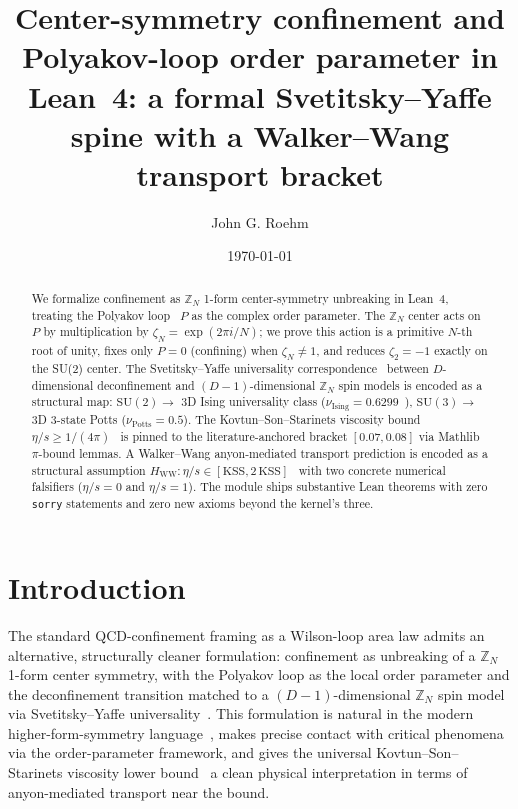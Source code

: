 \documentclass[twocolumn]{revtex4-2}
\newcommand{\Polyakov}{P}
\newcommand{\KSS}{\eta/s}
\newcommand{\nuIsing}{\nu_{\mathrm{Ising}}}
\newcommand{\nuPotts}{\nu_{\mathrm{Potts}}}
\begin{document}
\title{Center-symmetry confinement and Polyakov-loop order parameter
in Lean~4: a formal Svetitsky--Yaffe spine with a Walker--Wang
transport bracket}

\author{John G. Roehm}

\date{\today}

\begin{abstract}
We formalize confinement as $\mathbb{Z}_N$ 1-form center-symmetry
unbreaking in Lean~4, treating the Polyakov loop~\cite{Polyakov1978}
$\Polyakov$ as the
complex order parameter. The $\mathbb{Z}_N$ center acts on $\Polyakov$
by multiplication by $\zeta_N = \exp(2\pi i / N)$; we prove this action
is a primitive $N$-th root of unity, fixes only $\Polyakov = 0$
(confining) when $\zeta_N \neq 1$, and reduces $\zeta_2 = -1$ exactly
on the SU(2) center. The Svetitsky--Yaffe universality
correspondence~\cite{SvetitskyYaffe1982} between $D$-dimensional
deconfinement and $(D{-}1)$-dimensional $\mathbb{Z}_N$ spin models is
encoded as a structural map: $\mathrm{SU}(2) \to$ 3D Ising universality
class ($\nuIsing = 0.6299$~\cite{PelissettoVicari2002,
KosPolandSimmonsDuffin2016}), $\mathrm{SU}(3) \to$ 3D 3-state Potts
($\nuPotts = 0.5$). The Kovtun--Son--Starinets viscosity bound
$\KSS \ge 1/(4\pi)$~\cite{KovtunSonStarinets2005} is pinned to the
literature-anchored bracket $[0.07, 0.08]$ via Mathlib $\pi$-bound
lemmas. A Walker--Wang anyon-mediated transport prediction is encoded
as a structural assumption $H_{\mathrm{WW}} : \KSS \in [\mathrm{KSS},
2\,\mathrm{KSS}]$~\cite{HofmanIqbal2018} with two concrete numerical
falsifiers ($\KSS = 0$ and $\KSS = 1$). The module ships \centerSymmThms{}
substantive Lean theorems with zero \texttt{sorry} statements and zero
new axioms beyond the kernel's three.
\end{abstract}

\maketitle

\section{Introduction}
\label{sec:intro}

The standard QCD-confinement framing as a Wilson-loop area law admits
an alternative, structurally cleaner formulation: confinement as
unbreaking of a $\mathbb{Z}_N$ 1-form center symmetry, with the
Polyakov loop as the local order parameter and the deconfinement
transition matched to a $(D{-}1)$-dimensional $\mathbb{Z}_N$ spin
model via Svetitsky--Yaffe universality~\cite{SvetitskyYaffe1982}.
This formulation is natural in the modern higher-form-symmetry
language~\cite{KitaevAnyons2003}, makes precise contact with critical
phenomena via the order-parameter framework, and gives the universal
Kovtun--Son--Starinets viscosity lower
bound~\cite{KovtunSonStarinets2005} a clean physical interpretation
in terms of anyon-mediated transport near the bound.
\end{document}
